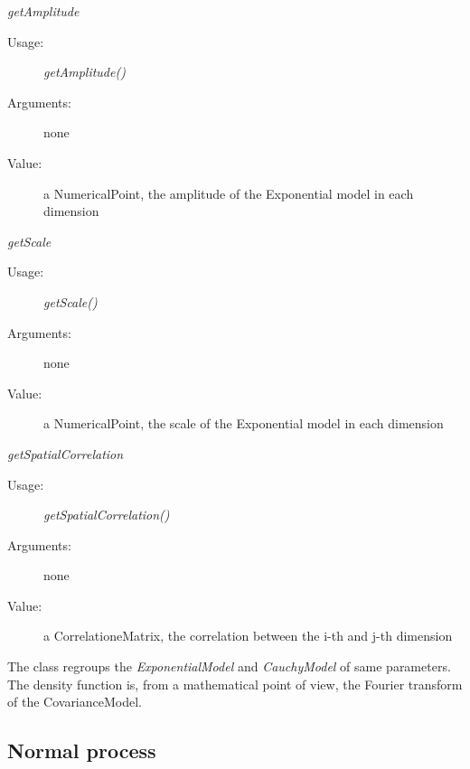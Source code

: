 \begin{description}
\begin{description}

\item \textit{getAmplitude}
\begin{description}
\item[Usage:] \textit{getAmplitude()}
\item[Arguments:] none
\item[Value:]   a NumericalPoint, the amplitude of the Exponential model in each dimension
\end{description}
\bigskip

\item \textit{getScale}
\begin{description}
\item[Usage:] \textit{getScale()}
\item[Arguments:] none
\item[Value:]   a NumericalPoint, the scale of the Exponential model in each dimension
\end{description}
\bigskip

\item \textit{getSpatialCorrelation}
\begin{description}
\item[Usage:] \textit{getSpatialCorrelation()}
\item[Arguments:] none
\item[Value:]   a CorrelationeMatrix, the correlation between the i-th and j-th dimension
\end{description}
\bigskip

\end{description}

\item[Remark:]  \rule{0pt}{1em}

The class regroups the \textit{ExponentialModel} and \textit{CauchyModel} of same parameters.\\
The density function is, from a mathematical point of view, the Fourier transform of the CovarianceModel.

\end{description}


\newpage
\subsection{Normal process}

